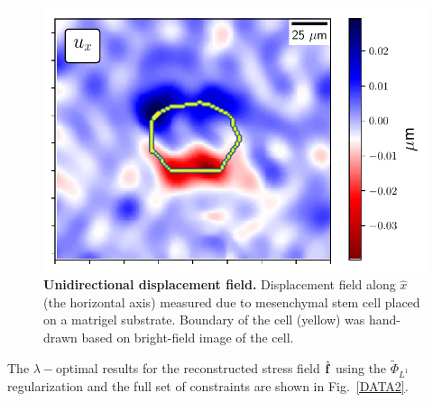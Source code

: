 \documentclass[aps,prl,reprint,twocolumn,groupedaddress,showpacs]{revtex4}
\def\f{{\bf f}}
\begin{document}
\begin{figure}
\includegraphics[width=\linewidth]{fig8}
\caption{\textbf{Unidirectional displacement field.} Displacement
field along $\hat{x}$ (the horizontal axis) measured due to mesenchymal stem cell
placed on a matrigel substrate. Boundary of the cell (yellow) was hand-drawn
based on bright-field image of the cell.
}
\label{DATA}
\end{figure}
%
The $\lambda-$optimal results for the reconstructed stress field
$\hat{\f}$ using the $\tilde{\Phi}_{L^{1}}$ regularization and the
full set of constraints are shown in Fig.~\ref{DATA2}.
\end{document}
